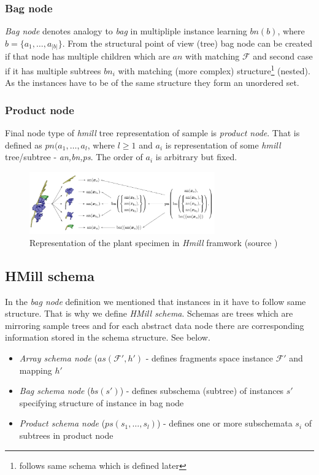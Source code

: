 \subsubsection{Bag node}
\emph{Bag node} denotes analogy to \emph{bag} in multipliple instance learning $bn(b)$, where $b=\{a_1,\dots,a_{|b|}\}$. From the structural point of view (tree) bag node can be created if that node has multiple children which are $an$ with matching $\mathcal{F}$ and second case if it has multiple subtrees $bn_i$ with matching (more complex) structure\footnote{follows same schema which is defined later} (nested). As the instances have to be of the same structure they form an unordered set.

\subsubsection{Product node}
Final node type of \emph{hmill} tree representation of sample is \emph{product node}. That is defined as $pn(a_1,\dots,a_{l}$, where $l\geq1$ and $a_i$ is representation of some \emph{hmill} tree/subtree - \emph{an,bn,ps}. The order of $a_i$ is arbitrary but fixed.

\begin{figure}[h]
    \centering
    \includegraphics[width=8cm]{figures/irismill.png}
    \caption{Representation of the plant specimen in \emph{Hmill} framwork (source \cite{Mandlik2020})}
    \label{fig:irismill}
\end{figure}

\subsection{HMill schema}
In the \emph{bag node} definition we mentioned that instances in it have to follow same structure. That is why we define \emph{HMill schema}. Schemas are trees which are mirroring sample trees and for each abstract data node there are corresponding information stored in the schema structure. See below.
\begin{itemize}
    \item \emph{Array schema node} ($as(\mathcal{F'},h')$ - defines fragments space instance $\mathcal{F'}$ and mapping $h'$
    \item \emph{Bag schema node} ($bs(s')$) - defines subschema (subtree) of instances $s'$ specifying structure of instance in bag node
    \item \emph{Product schema node} ($ps(s_1,\dots,s_{l})$) - defines one or more subschemata $s_i$ of subtrees in product node
\end{itemize}

